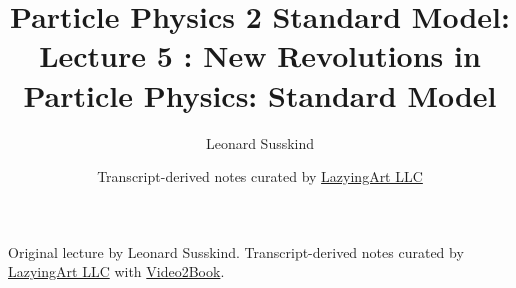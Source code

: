 \documentclass[11pt,oneside]{book}
\begin{document}
\frontmatter
\title{Particle Physics 2 Standard Model: Lecture 5 : New Revolutions in Particle Physics: Standard Model}
\author{Leonard Susskind}
\date{Transcript-derived notes curated by \href{https://lazying.art}{LazyingArt LLC}}
\maketitle
\begin{center}
\small Original lecture by Leonard Susskind. Transcript-derived notes curated by \href{https://lazying.art}{LazyingArt LLC} with \href{https://github.com/lachlanchen/Video2Book}{Video2Book}.
\end{center}
\clearpage
\mainmatter

\end{document}
